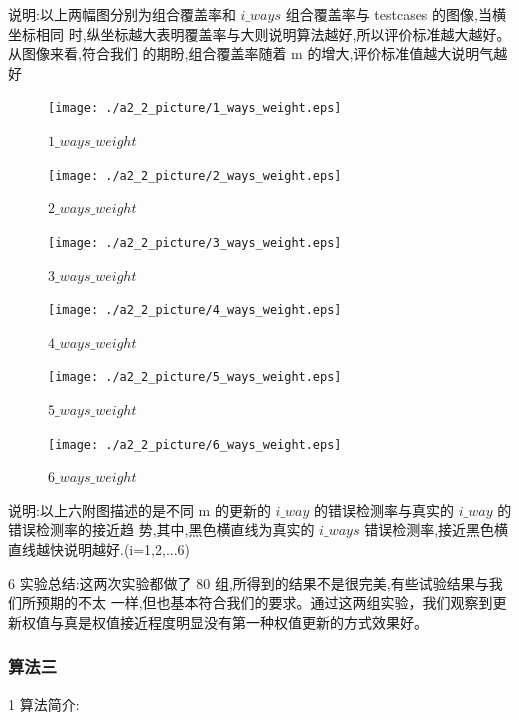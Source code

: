 \documentclass[10pt,journal,letterpaper,compsoc]{IEEEtran}
\begin{document}
\begin{CJK}{UTF8}{gkai}
说明:以上两幅图分别为组合覆盖率和 $i\_ways$ 组合覆盖率与 testcases 的图像,当横坐标相同
时,纵坐标越大表明覆盖率与大则说明算法越好,所以评价标准越大越好。从图像来看,符合我们
的期盼,组合覆盖率随着 m 的增大,评价标准值越大说明气越好
 \begin{figure}[htb]
   \centering
   \texttt{[image: ./a2\_2\_picture/1\_ways\_weight.eps]}
   \caption{$1\_ways\_weight$}
   \label{fig:ARCH}
 \end{figure}
 \begin{figure}[htb]
   \centering
   \texttt{[image: ./a2\_2\_picture/2\_ways\_weight.eps]}
   \caption{$2\_ways\_weight$}
   \label{fig:ARCH}
 \end{figure}
 \begin{figure}[htb]
   \centering
   \texttt{[image: ./a2\_2\_picture/3\_ways\_weight.eps]}
   \caption{$3\_ways\_weight$}
   \label{fig:ARCH}
 \end{figure}
 \begin{figure}[htb]
   \centering
   \texttt{[image: ./a2\_2\_picture/4\_ways\_weight.eps]}
   \caption{$4\_ways\_weight$}
   \label{fig:ARCH}
 \end{figure}
 \begin{figure}[htb]
   \centering
   \texttt{[image: ./a2\_2\_picture/5\_ways\_weight.eps]}
   \caption{$5\_ways\_weight$}
   \label{fig:ARCH}
 \end{figure}
 \begin{figure}[htb]
   \centering
   \texttt{[image: ./a2\_2\_picture/6\_ways\_weight.eps]}
   \caption{$6\_ways\_weight$}
   \label{fig:ARCH}
 \end{figure}
说明:以上六附图描述的是不同 m 的更新的 $i\_way$ 的错误检测率与真实的 $i\_way$ 的错误检测率的接近趋
势,其中,黑色横直线为真实的 $i\_ways$ 错误检测率,接近黑色横直线越快说明越好.(i=1,2,...6)

6 实验总结:这两次实验都做了 80 组,所得到的结果不是很完美,有些试验结果与我们所预期的不太
一样,但也基本符合我们的要求。通过这两组实验，我们观察到更
新权值与真是权值接近程度明显没有第一种权值更新的方式效果好。

	\subsubsection{算法三}
1 算法简介:


\end{CJK}
\end{document}
